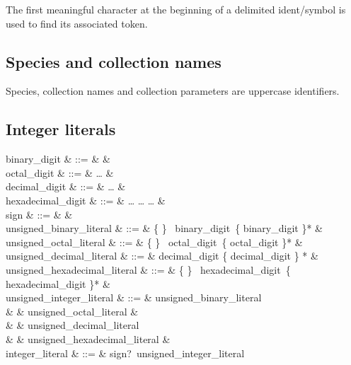 The first meaningful character at the beginning of a delimited
ident/symbol is used to find its associated token.

\subsection{Species and collection names}
 Species, collection
names and collection parameters are uppercase identifiers.

\subsection{Integer literals}
\label{integer literals}
\label{octal}
\label{hexadecimal}
\label{binary}

\begin{syntax}
                 binary\_digit & ::= &  \mid {} & \\
                  octal\_digit & ::= &  \ldots {} & \\
                decimal\_digit & ::= &  \ldots {} & \\
            hexadecimal\_digit & ::= &  \ldots {}
                                       \mid {} \ldots {}
                                       \mid {} \ldots {} & \\
                          sign & ::= & \terminal{+} \mid \terminal{-} & \\
     unsigned\_binary\_literal & ::= &  \{ 
                                       \mid {} \} \ binary\_digit\ \{ binary\_digit
                                       \mid \terminal{\_} \}* & \\
      unsigned\_octal\_literal & ::= &  \{ 
                                       \mid {} \}
                                       \ octal\_digit\ \{ octal\_digit
                                       \mid \terminal{\_} \}* & \\
    unsigned\_decimal\_literal & ::= & decimal\_digit \{ decimal\_digit
                                       \mid \terminal{\_} \} * & \\
unsigned\_hexadecimal\_literal & ::= &
   \{  \mid {} \}
  \ hexadecimal\_digit\ \{ hexadecimal\_digit \mid \terminal{\_} \}* & \\
    unsigned\_integer\_literal & ::= & unsigned\_binary\_literal \\
                               &     & \mid unsigned\_octal\_literal & \\
                               &     & \mid unsigned\_decimal\_literal \\
                               &     & \mid unsigned\_hexadecimal\_literal & \\
              integer\_literal & ::= & sign?\ unsigned\_integer\_literal
\end{syntax}

